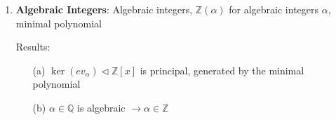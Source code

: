 \documentclass{article}
\begin{document}
\begin{enumerate}
	\item \textbf{Algebraic Integers}: Algebraic integers, $\mathbb{Z}(\alpha)$ for algebraic integers $\alpha$, minimal polynomial 

	Results:
	\begin{enumerate}
		\item [(a)] $\ker{(ev_{\alpha})} \triangleleft \mathbb{Z}[x]$ is principal, generated by the minimal polynomial

		\item [(b)] $\alpha \in \mathbb{Q}$ is algebraic $\rightarrow \alpha \in \mathbb{Z}$
	\end{enumerate}
\end{enumerate}
\end{document}
